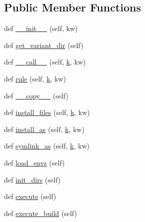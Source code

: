 \subsection*{Public Member Functions}
\begin{DoxyCompactItemize}
\item 
def \hyperlink{classwaflib_1_1_build_1_1_build_context_a04e1b540edfafc14247ff272cb62e604}{\+\_\+\+\_\+init\+\_\+\+\_\+} (self, kw)
\item 
def \hyperlink{classwaflib_1_1_build_1_1_build_context_acc99340a3386e41dc8d7b6b677db0536}{get\+\_\+variant\+\_\+dir} (self)
\item 
def \hyperlink{classwaflib_1_1_build_1_1_build_context_ad658b3ed93230daaed1fd1d25488df4b}{\+\_\+\+\_\+call\+\_\+\+\_\+} (self, \hyperlink{rfft2d_test_m_l_8m_adc468c70fb574ebd07287b38d0d0676d}{k}, kw)
\item 
def \hyperlink{classwaflib_1_1_build_1_1_build_context_a46943e460fe05c7285a5e14154afab6c}{rule} (self, \hyperlink{rfft2d_test_m_l_8m_adc468c70fb574ebd07287b38d0d0676d}{k}, kw)
\item 
def \hyperlink{classwaflib_1_1_build_1_1_build_context_a4a0f871a711f02e9b65210633a14c6c2}{\+\_\+\+\_\+copy\+\_\+\+\_\+} (self)
\item 
def \hyperlink{classwaflib_1_1_build_1_1_build_context_ae579a92fd181e2d51337b641cb153439}{install\+\_\+files} (self, \hyperlink{rfft2d_test_m_l_8m_adc468c70fb574ebd07287b38d0d0676d}{k}, kw)
\item 
def \hyperlink{classwaflib_1_1_build_1_1_build_context_aba7c5ce03b3cd0d2e8c490d6470a6a9e}{install\+\_\+as} (self, \hyperlink{rfft2d_test_m_l_8m_adc468c70fb574ebd07287b38d0d0676d}{k}, kw)
\item 
def \hyperlink{classwaflib_1_1_build_1_1_build_context_a9b86ee2dd78a51893a2135970f9c6c9c}{symlink\+\_\+as} (self, \hyperlink{rfft2d_test_m_l_8m_adc468c70fb574ebd07287b38d0d0676d}{k}, kw)
\item 
def \hyperlink{classwaflib_1_1_build_1_1_build_context_aeac17c7231c914a04f552b68428f1d0a}{load\+\_\+envs} (self)
\item 
def \hyperlink{classwaflib_1_1_build_1_1_build_context_adb8b13740f058cd0e790340c5f6edf06}{init\+\_\+dirs} (self)
\item 
def \hyperlink{classwaflib_1_1_build_1_1_build_context_a8ef990b5bfdcc98634c6e1248398ecc2}{execute} (self)
\item 
def \hyperlink{classwaflib_1_1_build_1_1_build_context_ab150f731e961183d0acef3aa8c38d345}{execute\+\_\+build} (self)

\end{DoxyCompactItemize}
